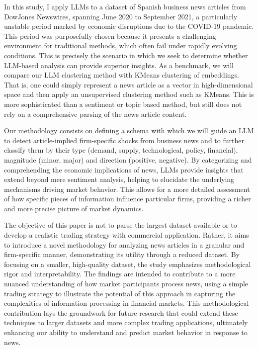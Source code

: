 In this study, I apply LLMs to a dataset of Spanish business news articles from DowJones Newswires, spanning June 2020 to September 2021, a particularly unstable period marked by economic disruptions due to the COVID-19 pandemic. This period was purposefully chosen because it presents a challenging environment for traditional
 methods, which often fail under rapidly evolving conditions. 
 This is precisely the scenario in which we seek to determine whether LLM-based analysis can provide superior insights. As a benchmark, we will compare our LLM clustering method with KMeans clustering of embeddings. That is, one could simply represent a news article as a  vector in high-dimensional space and then apply an unsupervised clustering method such as KMeans. This is more sophisticated than a sentiment or topic based method, but still does not rely on a comprehensive parsing of the news article content. 

Our methodology consists on defining a schema with which we will guide an LLM to detect article-implied firm-specific shocks from business news and to further classify them by their type (demand, supply, technological, policy, financial), magnitude (minor, major) and direction (positive, negative). By categorizing and comprehending the economic implications of news, LLMs provide insights that extend beyond mere sentiment analysis, helping to elucidate the underlying mechanisms driving market behavior. 
This allows for a more detailed assessment of how specific pieces of information influence particular firms, providing a richer and more precise picture of market dynamics.

The objective of this paper is not to parse the largest dataset available or to develop a realistic trading strategy with commercial application. Rather, it aims to introduce a novel methodology for analyzing news articles in a granular and firm-specific manner, demonstrating its utility through a reduced dataset. By focusing on a smaller, high-quality dataset, the study emphasizes methodological rigor and interpretability. The findings are intended to contribute to a more nuanced understanding of how market participants process news, using a simple trading strategy to illustrate the potential of this approach in capturing the complexities of information processing in financial markets. This methodological contribution lays the groundwork for future research that could extend these techniques to larger datasets and more complex trading applications, ultimately enhancing our ability to understand and predict market behavior in response to news.

